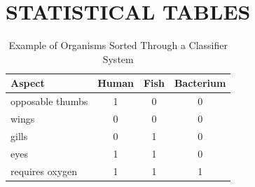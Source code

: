 \documentclass{strrespaper-trad}
\begin{document}
		

	\chapter{STATISTICAL TABLES}
		\begin{table}[htbp]
			\centering
			\caption{Example of Organisms Sorted Through a Classifier System}
			\label{tab:ex_classifier}
			\begin{tabular}{lccc}
				\toprule
				Aspect           & Human & Fish & Bacterium \\
				\midrule
				opposable thumbs & 1     & 0    & 0         \\
				wings            & 0     & 0    & 0         \\
				gills            & 0     & 1    & 0         \\
				eyes             & 1     & 1    & 0         \\
				requires oxygen  & 1     & 1    & 1         \\
				\bottomrule
			\end{tabular}
		\end{table}
\end{document}
